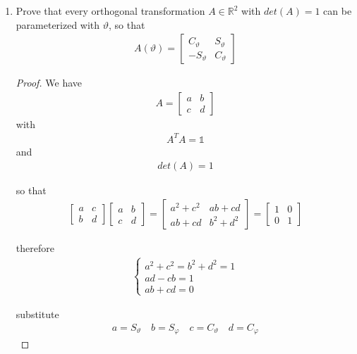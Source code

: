 \documentclass[11pt,a4paper]{article}
\begin{document}
\begin{enumerate}

\item[]

Prove that every orthogonal transformation $A\in\mathbb{R}^2$ with $det(A)=1$ can be parameterized with $\vartheta$, so that
\begin{align}
A(\vartheta)=
\begin{bmatrix}
C_\vartheta & S_\vartheta \\
-S_\vartheta & C_\vartheta
\end{bmatrix}
\end{align}

\begin{proof}

We have
\begin{align}
A=
\begin{bmatrix}
a & b \\
c & d
\end{bmatrix}
\end{align}
with
\begin{align}
A^TA=\mathbb{1}
\end{align}
and 
\begin{align}
det(A)=1
\end{align}

so that
\begin{align}
\begin{bmatrix}
a & c \\
b & d
\end{bmatrix}
\begin{bmatrix}
a & b \\
c & d
\end{bmatrix}
=
\begin{bmatrix}
a^2+c^2 & ab+cd \\
ab+cd & b^2+d^2
\end{bmatrix}
=
\begin{bmatrix}
1 & 0 \\
0 & 1
\end{bmatrix}
\end{align}

therefore
\begin{align}
\left\{
\begin{array}{lcl}
a^2+c^2=b^2+d^2=1 \\
ad-cb=1 \\
ab+cd=0
\end{array}
\right.
\end{align}

substitute
\begin{align}
a=S_\vartheta\hspace{1em}
b=S_\varphi\hspace{1em}
c=C_\vartheta\hspace{1em}
d=C_\varphi
\end{align}


\end{proof}
\end{enumerate}
\end{document}
